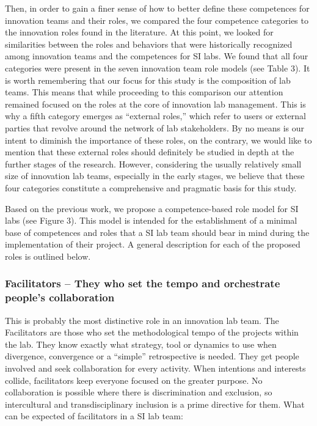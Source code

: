 \documentclass[AMA,STIX1COL,APA,STIX2COL]{WileyNJD-v2}
\begin{document}
Then, in order to gain a finer sense of how to better define these
competences for innovation teams and their roles, we compared the four
competence categories to the innovation roles found in the literature.
At this point, we looked for similarities between the roles and
behaviors that were historically recognized among innovation teams and
the competences for SI labs. We found that all four categories were
present in the seven innovation team role models (see Table 3). It is
worth remembering that our focus for this study is the composition of
lab teams. This means that while proceeding to this comparison our
attention remained focused on the roles at the core of innovation lab
management. This is why a fifth category emerges as ``external roles,''
which refer to users or external parties that revolve around the network
of lab stakeholders. By no means is our intent to diminish the
importance of these roles, on the contrary, we would like to mention
that these external roles should definitely be studied in depth at the
further stages of the research. However, considering the usually
relatively small size of innovation lab teams, especially in the early
stages, we believe that these four categories constitute a comprehensive
and pragmatic basis for this study.

Based on the previous work, we propose a competence-based role model for
SI labs (see Figure 3). This model is intended for the establishment of
a minimal base of competences and roles that a SI lab team should bear
in mind during the implementation of their project. A general
description for each of the proposed roles is outlined below.

\hypertarget{facilitators-they-who-set-the-tempo-and-orchestrate-peoples-collaboration}{%
\subsubsection{Facilitators -- They who set the tempo and orchestrate
people's
collaboration}\label{facilitators-they-who-set-the-tempo-and-orchestrate-peoples-collaboration}}

This is probably the most distinctive role in an innovation lab team.
The Facilitators are those who set the methodological tempo of the
projects within the lab. They know exactly what strategy, tool or
dynamics to use when divergence, convergence or a ``simple''
retrospective is needed. They get people involved and seek collaboration
for every activity. When intentions and interests collide, facilitators
keep everyone focused on the greater purpose. No collaboration is
possible where there is discrimination and exclusion, so intercultural
and transdisciplinary inclusion is a prime directive for them. What can
be expected of facilitators in a SI lab team:
\end{document}
